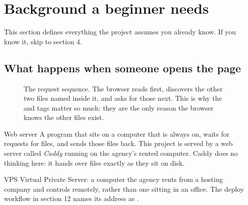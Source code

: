 \documentclass[11pt,a4paper]{article}
\begin{document}
\section{Background a beginner needs}

This section defines everything the project assumes you already know. If you
know it, skip to section 4.

\subsection{What happens when someone opens the page}

\begin{figure}[H]\centering
{}
\caption{The request sequence. The browser reads  first,
discovers the other two files named inside it, and asks for those next. This is
why the  and  tags matter so much: they are the only
reason the browser knows the other files exist.}
\end{figure}

\begin{jargon}{Web server}
A program that sits on a computer that is always on, waits for requests for
files, and sends those files back. This project is served by a web server called
\emph{Caddy} running on the agency's rented computer. Caddy does no thinking
here: it hands over files exactly as they sit on disk.
\end{jargon}

\begin{jargon}{VPS}
Virtual Private Server: a computer the agency rents from a hosting company and
controls remotely, rather than one sitting in an office. The deploy workflow in
section 12 names its address as .
\end{jargon}
\end{document}
